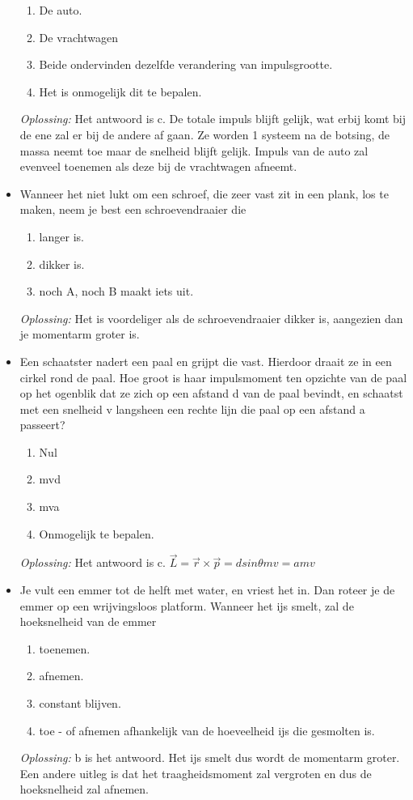 \documentclass[12pt,a4paper]{article}
\begin{document}
\begin{itemize}
\begin{enumerate}[label=\alph*]
		\item De auto.
		\item De vrachtwagen
		\item Beide ondervinden dezelfde verandering van impulsgrootte.
		\item Het is onmogelijk dit te bepalen. 
	\end{enumerate}
	\textit{Oplossing:} Het antwoord is c. De totale impuls blijft gelijk, wat erbij komt bij de ene zal er bij de andere af gaan. Ze worden 1 systeem na de botsing, de massa neemt toe maar de snelheid blijft gelijk. Impuls van de auto zal evenveel toenemen als deze bij de vrachtwagen afneemt. 
	\newline
	\item Wanneer het niet lukt om een schroef, die zeer vast zit in een plank, los te maken, neem je best een schroevendraaier die
	\begin{enumerate}[label=\alph*]
		\item langer is.
		\item dikker is.
		\item noch A, noch B maakt iets uit.
	\end{enumerate}
	\textit{Oplossing:} Het is voordeliger als de schroevendraaier dikker is, aangezien dan je momentarm groter is. 
	\newline
	\item Een schaatster nadert een paal en grijpt die vast. Hierdoor draait ze in een cirkel rond de paal. Hoe groot is haar impulsmoment ten opzichte van de paal op het ogenblik dat ze zich op een afstand d van de paal bevindt, en schaatst met een snelheid v langsheen een rechte lijn die paal op een afstand a passeert?
	\begin{enumerate}[label=\alph*]
		\item Nul
		\item mvd
		\item mva
		\item Onmogelijk te bepalen. 
	\end{enumerate}
	\textit{Oplossing:} Het antwoord is c. \(\vec{L} = \vec{r} \times \vec{p} = d sin\theta m v = amv\)
	\newline
	\item Je vult een emmer tot de helft met water, en vriest het in. Dan roteer je de emmer op een wrijvingsloos platform. Wanneer het ijs smelt, zal de hoeksnelheid van de emmer
	\begin{enumerate}[label=\alph*]
		\item toenemen.
		\item afnemen.
		\item constant blijven.
		\item toe - of afnemen afhankelijk van de hoeveelheid ijs die gesmolten is. 
	\end{enumerate}
	\textit{Oplossing:} b is het antwoord. Het ijs smelt dus wordt de momentarm groter. Een andere uitleg is dat het traagheidsmoment zal vergroten en dus de hoeksnelheid zal afnemen. 
	\end{itemize}
    \newpage
\end{document}
